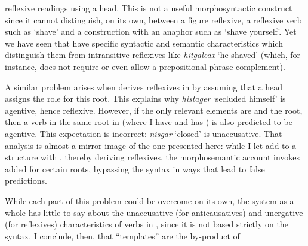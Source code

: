 \begin{exe}
\begin{xlist}
\begin{xlist}
\begin{exe}
\begin{xlist}
\begin{xlist}
\begin{exe}
\begin{xlist}
\begin{xlist}
\begin{exe}
\begin{exe}
\begin{xlist}
\begin{exe}
\begin{exe}
\begin{xlist}
\begin{exe}
\begin{exe}
\begin{exe}
\begin{exe}
\begin{exe}
\begin{xlist}
\begin{exe}
\begin{xlist}
\begin{exe}
\begin{exe}
\begin{xlist}
\begin{exe}
\begin{xlist}
\begin{exe}
\begin{exe}
\begin{exe}
\begin{xlist}
\begin{exe}
\begin{exe}
\begin{exe}
\begin{xlist}
\begin{exe}
\begin{xlist}
\begin{exe}
\begin{xlist}
\begin{exe}
\begin{xlist}
\begin{exe}
\begin{exe}
\begin{exe}
\begin{exe}
\begin{xlist}
\begin{exe}
\begin{xlist}
\begin{exe}
\begin{xlist}
\begin{exe}
\begin{xlist}
\begin{exe}
\begin{xlist}
\begin{exe}
\begin{xlist}
\begin{exe}
\begin{exe}
\begin{exe}
\begin{exe}
\begin{xlist}
\begin{exe}
\begin{xlist}
\begin{exe}
\begin{xlist}
\begin{exe}
\begin{exe}
\begin{xlist}
\begin{exe}
\begin{exe}
\begin{exe}
\begin{exe}
\begin{xlist}
\begin{xlist}
\begin{exe}
\begin{xlist}
\begin{exe}
\begin{exe}
\begin{exe}
\begin{xlist}
\begin{exe}
\begin{exe}
\begin{xlist}
\begin{exe}
\begin{exe}
\begin{exe}
\begin{xlist}
\begin{xlist}
\begin{exe}
\begin{xlist}
\begin{exe}
\begin{exe}
\begin{exe}
\begin{exe}
\begin{xlist}
\begin{exe}
\begin{xlist}
\begin{exe}
\begin{xlist}
\begin{exe}
\begin{exe}
\begin{exe}
\begin{exe}
\begin{exe}
\begin{exe}
\begin{xlist}
\begin{exe}
\begin{xlist}
\begin{exe}
\begin{xlist}
\begin{exe}
\begin{xlist}
\begin{exe}
\begin{xlist}
\begin{exe}
\begin{xlist}
reflexive readings using a  head. This is not a useful morphosyntactic construct since it cannot distinguish, on its own, between a figure reflexive, a reflexive verb such as `shave’ and a construction with an anaphor such as `shave yourself’. Yet we have seen that  have specific syntactic and semantic characteristics which distinguish them from intransitive reflexives like \emph{hitgaleax} `he shaved’ (which, for instance, does not require or even allow a prepositional phrase complement).

A similar problem arises when \citet[60]{doron03} derives reflexives in {\thit} by assuming that a head  assigns the  role for this root. This explains why \emph{histager} `secluded himself' is agentive, hence reflexive. However, if the only relevant elements are {\vz} and the root, then a verb in the same root in {\tnif} (where I have {\vz} and \citealt{doron03} has ) is also predicted to be agentive. This expectation is incorrect: \emph{nisgar} `closed' is unaccusative. That analysis is almost a mirror image of the one presented here: while I let {\va} add  to a structure with \vz, thereby deriving reflexives, the morphosemantic account invokes added  for certain roots, bypassing the syntax in ways that lead to false predictions.

While each part of this problem could be overcome on its own, the system as a whole has little to say about the unaccusative (for anticausatives) and unergative (for reflexives) characteristics of verbs in {\thit}, since it is not based strictly on the syntax. I conclude, then, that ``templates'' are the by-product of 
\end{xlist}
\end{exe}
\end{xlist}
\end{exe}
\end{xlist}
\end{exe}
\end{xlist}
\end{exe}
\end{xlist}
\end{exe}
\end{xlist}
\end{exe}
\end{exe}
\end{exe}
\end{exe}
\end{exe}
\end{exe}
\end{xlist}
\end{exe}
\end{xlist}
\end{exe}
\end{xlist}
\end{exe}
\end{exe}
\end{exe}
\end{exe}
\end{xlist}
\end{exe}
\end{xlist}
\end{xlist}
\end{exe}
\end{exe}
\end{exe}
\end{xlist}
\end{exe}
\end{exe}
\end{xlist}
\end{exe}
\end{exe}
\end{exe}
\end{xlist}
\end{exe}
\end{xlist}
\end{xlist}
\end{exe}
\end{exe}
\end{exe}
\end{exe}
\end{xlist}
\end{exe}
\end{exe}
\end{xlist}
\end{exe}
\end{xlist}
\end{exe}
\end{xlist}
\end{exe}
\end{exe}
\end{exe}
\end{exe}
\end{xlist}
\end{exe}
\end{xlist}
\end{exe}
\end{xlist}
\end{exe}
\end{xlist}
\end{exe}
\end{xlist}
\end{exe}
\end{xlist}
\end{exe}
\end{exe}
\end{exe}
\end{exe}
\end{xlist}
\end{exe}
\end{xlist}
\end{exe}
\end{xlist}
\end{exe}
\end{xlist}
\end{exe}
\end{exe}
\end{exe}
\end{xlist}
\end{exe}
\end{exe}
\end{exe}
\end{xlist}
\end{exe}
\end{xlist}
\end{exe}
\end{exe}
\end{xlist}
\end{exe}
\end{xlist}
\end{exe}
\end{exe}
\end{exe}
\end{exe}
\end{exe}
\end{xlist}
\end{exe}
\end{exe}
\end{xlist}
\end{exe}
\end{exe}
\end{xlist}
\end{xlist}
\end{exe}
\end{xlist}
\end{xlist}
\end{exe}
\end{xlist}
\end{xlist}
\end{exe}
